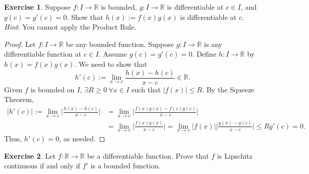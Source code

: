 \documentclass[12pt]{article}
\theoremstyle{definition}
\newtheorem{exercise}{Exercise}
\begin{document}
\begin{exercise}
    Suppose \(f : I \to \mathbb{R}\) is bounded, \(g: I \to \mathbb{R}\) is differentiable at \(c \in I\), and \(g(c) = g'(c) = 0\). Show that \(h(x) := f(x)g(x)\) is differentiable at \(c\). \textit{Hint}: You cannot apply the Product Rule.
\end{exercise}

\begin{proof}
    Let \(f : I \to \mathbb{R}\) be any bounded function. Suppose \(g : I \to \mathbb{R}\) is any differentiable function at \(c \in I\). Assume \(g(c) = g'(c) = 0\). Define \(h : I \to \mathbb{R}\) by \(h(x) = f(x)g(x)\). We need to show that
    \[
        h'(c) := \lim_{x \to c}\frac{h(x) - h(c)}{x - c} \in \mathbb{R}.
    \]
    Given \(f\) is bounded on \(I\), \(\exists R \geq 0 \ \forall x \in I\) such that \(\vert f(x) \vert \leq R\). By the Squeeze Theorem,
    \begin{align*}
        \vert h'(c) \vert := \lim_{x \to c} \bigg\vert \frac{h(x) - h(c)}{x - c} \bigg\vert &= \lim_{x \to c} \bigg\vert \frac{f(x)g(x) - f(c)g(c)}{x - c} \bigg\vert \\
        &= \lim_{x \to c} \bigg\vert \frac{f(x)g(x)}{x - c} \bigg\vert = \lim_{x \to c} \vert f(x) \vert \bigg\vert \frac{g(x) - g(c)}{x - c} \bigg\vert \leq Rg'(c) = 0. 
    \end{align*}
    Thus, \(h'(c) = 0\), as needed.
\end{proof}

\begin{exercise}
    Let \(f : \mathbb{R} \to \mathbb{R}\) be a diﬀerentiable function. Prove that \(f\) is Lipschitz continuous if and only if \(f'\) is a bounded function.
\end{exercise}
\end{document}
